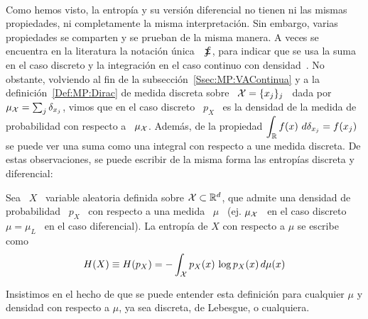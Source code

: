 \

Como hemos  visto, la  entrop\'ia y  su versi\'on diferencial  no tienen  ni las
mismas propiedades,  ni completamente  la misma interpretaci\'on.   Sin embargo,
varias propiedades  se comparten y  se prueban de la  misma manera.  A  veces se
encuentra en la  literatura la notaci\'on \'unica \ $\sumint$,  para indicar que
se usa la  suma en el caso discreto  y la integraci\'on en el  caso continuo con
densidad~\cite{Rio07}.     No    obstante,    volviendo    al    fin    de    la
subsecci\'on~\ref{Ssec:MP:VAContinua} y a  la definici\'on~\ref{Def:MP:Dirac} de
medida  discreta   sobre  \  $\mathcal{X}   =  \{  x_j  \}_j$   \  dada  por   \  $\mu_{\mathcal{X}}
= \sum_j \delta_{x_j}$, vimos  que en el caso discreto \ $p_X$  \ es la densidad
de  la medida  de  probabilidad con  respecto  a \  $\mu_{\mathcal{X}}$.   Adem\'as, de  la
propiedad $\displaystyle \int_{\mathbb{R}} f(x) \  d\delta_{x_j} = f(x_j)$ se puede ver
una  suma como  una  integral con  respecto  a une  medida  discreta.  De  estas
observaciones, se  puede escribir de la  misma forma las entrop\'ias  discreta y
diferencial:
%
\begin{definicion}
\label{Def:SZ:ShanonMu}
%
Sea \ $X$ \ variable aleatoria definida sobre $\mathcal{X} \subset \mathbb{R}^d$, que admite
una  densidad de  probabilidad \  $p_X$ \  con respecto  a una  medida \  $\mu$ \
(ej.  $\mu_{\mathcal{X}}$  \  en   el  caso  discreto  \  $\mu  =  \mu_L$   \  en  el  caso
diferencial). La entrop\'ia de $X$ con respecto a $\mu$ se escribe como
  \[
  H(X) \equiv H(p_X) = - \int_{\mathcal{X}} p_X(x) \, \log p_X(x) \, d\mu(x)
  \]
\end{definicion}
%
Insistimos en el hecho de que se puede entender esta definici\'on para cualquier
  $\mu$  y densidad  con  respecto a  $\mu$,  ya sea  discreta,  de Lebesgue,  o
  cualquiera.
